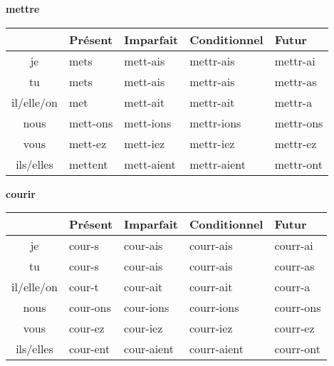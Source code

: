 \renewcommand{\stemPresent}{mett}
\renewcommand{\stemFutur}{mettr}
\begin{center}
\textbf{mettre}
\vskip 0.1cm
\begin{tabular}{|c||L{3cm}|L{3cm}|L{3cm}|L{3cm}|}
\hline
& Pr\'esent & Imparfait & Conditionnel & Futur \\
\hline\hline
je           &	mets 	&	\stemPresent-ais	&	\stemFutur-ais	 &	\stemFutur-ai	\\
tu           &	mets	&	\stemPresent-ais	&	\stemFutur-ais	&	\stemFutur-as	\\
il/elle/on &	met		&	\stemPresent-ait	&	\stemFutur-ait	&	\stemFutur-a	\\
nous      &	\stemPresent-ons	&	\stemPresent-ions	&	\stemFutur-ions	&	\stemFutur-ons	\\
vous      &	\stemPresent-ez	&	\stemPresent-iez	&	\stemFutur-iez		&	\stemFutur-ez	\\
ils/elles  &	mettent	&	\stemPresent-aient	&	\stemFutur-aient	&	\stemFutur-ont	\\
\hline
\end{tabular}
\end{center}

\renewcommand{\stemPresent}{cour}
\renewcommand{\stemFutur}{courr}
\begin{center}
\textbf{courir}
\vskip 0.1cm
\begin{tabular}{|c||L{3cm}|L{3cm}|L{3cm}|L{3cm}|}
\hline
& Pr\'esent & Imparfait & Conditionnel & Futur \\
\hline\hline
je           &	\stemPresent-s 	&	\stemPresent-ais	&	\stemFutur-ais	 &	\stemFutur-ai	\\
tu           &	\stemPresent-s	&	\stemPresent-ais	&	\stemFutur-ais	&	\stemFutur-as	\\
il/elle/on &	\stemPresent-t	&	\stemPresent-ait	&	\stemFutur-ait	&	\stemFutur-a	\\
nous      &	\stemPresent-ons	&	\stemPresent-ions	&	\stemFutur-ions	&	\stemFutur-ons	\\
vous      &	\stemPresent-ez	&	\stemPresent-iez	&	\stemFutur-iez		&	\stemFutur-ez	\\
ils/elles  &	\stemPresent-ent	&	\stemPresent-aient	&	\stemFutur-aient	&	\stemFutur-ont	\\
\hline
\end{tabular}
\end{center}







